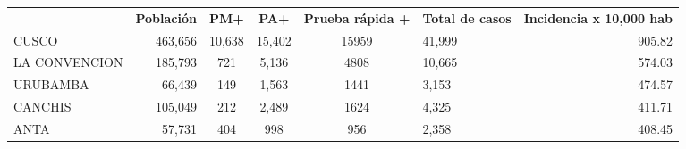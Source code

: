 	\begin{tabular}{lrccclr}
		\rowcolor[HTML]{DCE6F1} 
		\multicolumn{1}{c}{\cellcolor[HTML]{DCE6F1}\textbf{PROVINCIA}} & \multicolumn{1}{c}{\cellcolor[HTML]{DCE6F1}\textbf{Población}} & \textbf{PM+}                                                & \textbf{PA+}         & \textbf{Prueba rápida +} & \multicolumn{1}{c}{\cellcolor[HTML]{DCE6F1}\textbf{Total de casos}} & \multicolumn{1}{c}{\cellcolor[HTML]{DCE6F1}\textbf{Incidencia x 10,000 hab}} \\
		\cellcolor[HTML]{FF5050}CUSCO                                  & 463,656                                                        & 10,638                                                      & 15,402               & 15959                    & 41,999                                                              & 905.82                                                                       \\
		\cellcolor[HTML]{F4B084}LA   CONVENCION                        & 185,793                                                        & 721                                                         & 5,136                & 4808                     & 10,665                                                              & 574.03                                                                       \\
		\cellcolor[HTML]{F4B084}URUBAMBA                               & 66,439                                                         & 149                                                         & 1,563                & 1441                     & 3,153                                                               & 474.57                                                                       \\
		\cellcolor[HTML]{FFE699}CANCHIS                                & 105,049                                                        & 212                                                         & 2,489                & 1624                     & 4,325                                                               & 411.71                                                                       \\
		\cellcolor[HTML]{FFE699}ANTA                                   & 57,731                                                         & 404                                                         & 998                  & 956                      & 2,358                                                               & 408.45                                                                       \\

\end{tabular}

